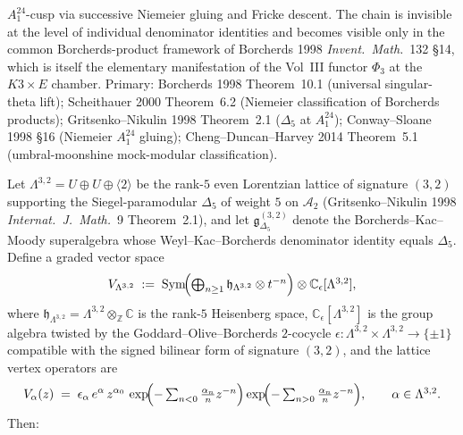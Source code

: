 \begin{remark}
$A_1^{24}$-cusp via successive Niemeier gluing and Fricke descent.
The chain is invisible at the level of individual
denominator identities and becomes visible only in the common
Borcherds-product framework of Borcherds 1998
\emph{Invent.~Math.}~132 \S14, which is itself the elementary
manifestation of the Vol~III functor $\Phi_3$ at the $K3\times E$
chamber. Primary: Borcherds 1998 Theorem~10.1 (universal
singular-theta lift); Scheithauer 2000 Theorem~6.2 (Niemeier
classification of Borcherds products); Gritsenko--Nikulin 1998
Theorem~2.1 ($\Delta_5$ at $A_1^{24}$); Conway--Sloane 1998 \S16
(Niemeier $A_1^{24}$ gluing); Cheng--Duncan--Harvey 2014
Theorem~5.1 (umbral-moonshine mock-modular classification).
\end{remark}

\begin{proposition}
\label{prop:k3ca-lattice-voa-Delta5-32}
Let $\Lambda^{3,2} = U\oplus U\oplus\langle 2\rangle$ be the rank-$5$
even Lorentzian lattice of signature $(3,2)$ supporting the
Siegel-paramodular $\Delta_5$ of weight $5$ on $\mathcal A_2$
(Gritsenko--Nikulin 1998 \emph{Internat.\ J.\ Math.}~9 Theorem~2.1),
and let $\mathfrak g_{\Delta_5}^{(3,2)}$ denote the Borcherds--Kac--Moody
superalgebra whose Weyl--Kac--Borcherds denominator identity equals
$\Delta_5$. Define a graded vector space
\begin{equation}
\label{eq:k3ca-lattice-VOA-32}
 V_{\Lambda^{3,2}}
 \;:=\;
 \mathrm{Sym}\!\Bigl(\textstyle\bigoplus_{n\geq 1}\mathfrak h_{\Lambda^{3,2}}\otimes t^{-n}\Bigr)
 \otimes \mathbb C_\epsilon[\Lambda^{3,2}],
\end{equation}
where $\mathfrak h_{\Lambda^{3,2}} = \Lambda^{3,2}\otimes_{\mathbb Z}\mathbb C$
is the rank-$5$ Heisenberg space, $\mathbb C_\epsilon[\Lambda^{3,2}]$ is the
group algebra twisted by the Goddard--Olive--Borcherds $2$-cocycle
$\epsilon:\Lambda^{3,2}\times\Lambda^{3,2}\to\{\pm 1\}$ compatible with
the signed bilinear form of signature $(3,2)$, and the lattice
vertex operators are
\begin{equation}
\label{eq:k3ca-VOA-operators-32}
 V_\alpha(z)
 \;=\;
 \epsilon_\alpha\,e^\alpha\,z^{\alpha_0}\,
 \exp\!\Bigl(\textstyle-\sum_{n<0}\tfrac{\alpha_n}{n}z^{-n}\Bigr)
 \exp\!\Bigl(\textstyle-\sum_{n>0}\tfrac{\alpha_n}{n}z^{-n}\Bigr),
 \qquad \alpha\in\Lambda^{3,2}.
\end{equation}
Then:
\begin{enumerate}

\end{enumerate}
\end{proposition}
